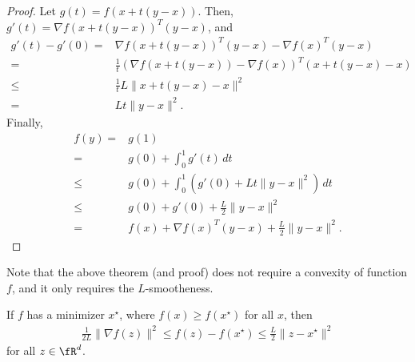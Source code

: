 \documentclass{article}
\begin{document}
\begin{proof}
    Let $g(t) = f(x+ t(y-x))$.
    Then, $g'(t) = \nabla f(x+t(y-x))^T (y-x)$, and
    \begin{align}
        g'(t) - g'(0) =& \nabla f(x+t(y-x))^T (y-x) - \nabla f(x)^T(y-x)\\
        =&\frac{1}{t} (\nabla f(x+t(y-x)) - \nabla f(x))^T(x+t(y-x) - x)\\
        \leq & \frac{1}{t} L\|x+t(y-x) - x\|^2\\
        =& L t\|y-x\|^2.
    \end{align}
    Finally,
    \begin{align}
        f(y) =&g(1)\\
        =& g(0) + \int_0^1 g'(t)\, dt\\
        \leq&  g(0) + \int_0^1 (g'(0) + Lt \|y-x\|^2 )\, dt\\
        \leq&  g(0) + g'(0) + \frac{L}{2} \|y-x\|^2\\
        =& f(x) + \nabla f(x)^T (y-x) + \frac{L}{2} \|y-x\|^2.
    \end{align}
\end{proof}

\begin{remark}
    Note that the above theorem (and proof) does not require a convexity of function $f$, and it only requires the $L$-smootheness.
\end{remark}

\begin{theorem}
    If $f$ has a minimizer $x^\star$, where $f(x) \geq f(x^\star)$ for all $x$, then
    \begin{align}
        \frac{1}{2L} \|\nabla f(z)\|^2 \leq f(z) - f(x^\star) \leq \frac{L}{2} \|z-x^\star\|^2
    \end{align}
    for all $z\in\fR^d$.
\end{theorem}
\end{document}
